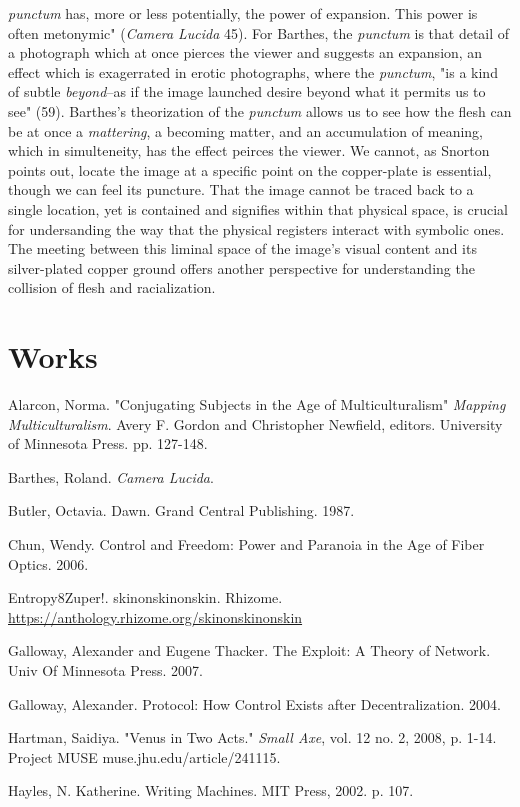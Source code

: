 \documentclass[11pt]{article}
\begin{document}
\emph{punctum} has, more or less potentially, the power of expansion. This
power is often metonymic" (\emph{Camera Lucida} 45). For Barthes, the
\emph{punctum} is that detail of a photograph which at once pierces the
viewer and suggests an expansion, an effect which is exagerrated in
erotic photographs, where the \emph{punctum}, "is a kind of subtle
\emph{beyond}--as if the image launched desire beyond what it permits us to
see" (59). Barthes's theorization of the \emph{punctum} allows us to see
how the flesh can be at once a \emph{mattering}, a becoming matter, and an
accumulation of meaning, which in simulteneity, has the effect peirces
the viewer. We cannot, as Snorton points out, locate the image at a
specific point on the copper-plate is essential, though we can feel
its puncture. That the image cannot be traced back to a single
location, yet is contained and signifies within that physical space,
is crucial for undersanding the way that the physical registers
interact with symbolic ones. The meeting between this liminal space of
the image's visual content and its silver-plated copper ground offers
another perspective for understanding the collision of flesh and
racialization.


\section{Works}
\label{sec:orga06a691}
Alarcon, Norma. "Conjugating Subjects in the Age of Multiculturalism"
\emph{Mapping Multiculturalism}. Avery F. Gordon and Christopher Newfield,
editors. University of Minnesota Press. pp. 127-148.

Barthes, Roland. \emph{Camera Lucida}.

Butler, Octavia. Dawn. Grand Central Publishing. 1987.

Chun, Wendy. Control and Freedom: Power and Paranoia in the Age of Fiber Optics. 2006.

Entropy8Zuper!. skinonskinonskin. Rhizome. \url{https://anthology.rhizome.org/skinonskinonskin} 

Galloway, Alexander and Eugene Thacker. The Exploit: A Theory of Network. Univ Of 
Minnesota Press. 2007. 

Galloway, Alexander. Protocol: How Control Exists after
Decentralization. 2004.

Hartman, Saidiya. "Venus in Two Acts." \emph{Small Axe}, vol. 12 no. 2,
   2008, p. 1-14. Project MUSE muse.jhu.edu/article/241115.

Hayles, N. Katherine. Writing Machines. MIT Press, 2002. p. 107.
\end{document}
